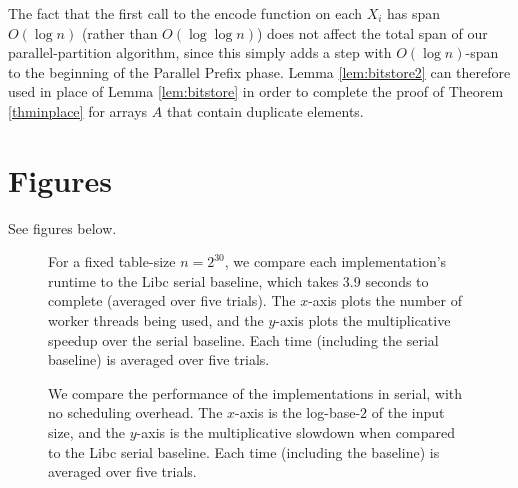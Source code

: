 \documentclass[twoside,leqno,twocolumn]{article}
\begin{document}
The fact that the first call to the encode function on each $X_i$ has
span $O(\log n)$ (rather than $O(\log \log n)$) does not affect the
total span of our parallel-partition algorithm, since this simply adds
a step with $O(\log n)$-span to the beginning of the Parallel Prefix
phase. Lemma \ref{lem:bitstore2} can therefore used in place of Lemma
\ref{lem:bitstore} in order to complete the proof of Theorem
\ref{thminplace} for arrays $A$ that contain duplicate elements.

\section{Figures}\label{sec:figures}
See figures below.
\begin{figure*}
  \begin{center}
    \CILKtable 
  \end{center}
    \caption{For a fixed table-size $n = 2^{30}$, we compare each
      implementation's runtime to the Libc serial baseline, which takes 3.9
      seconds to complete (averaged over five trials). The $x$-axis
      plots the number of worker threads being used, and the $y$-axis
      plots the multiplicative speedup over the serial baseline. Each
      time (including the serial baseline) is averaged over five trials.}
      \label{tablecilk}
\end{figure*}



\begin{figure*}
  \begin{center}
    \serialtable
  \end{center}
  \caption{We compare the performance of the implementations in
    serial, with no scheduling overhead. The $x$-axis is the
    log-base-$2$ of the input size, and the $y$-axis is the
    multiplicative slowdown when compared to the Libc serial baseline. Each
    time (including the baseline) is averaged over five
    trials.}
  \label{tableserial}
\end{figure*}
\end{document}
